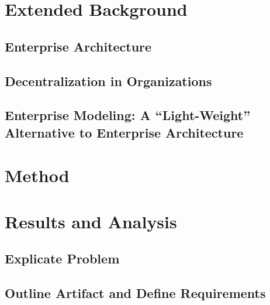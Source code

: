 \documentclass[12pt, a4, twoside, openright]{book}
\begin{document}
    \chapter{Extended Background}
    \label{chap:extendedBackgrounf}
    
    \section{Enterprise Architecture}
    \label{sec:ea}
    
    
    \section{Decentralization in Organizations}
    \label{sec:organizations}
       
    
    \section{Enterprise Modeling: A ``Light-Weight'' Alternative to Enterprise Architecture}
    \label{sec:related}
    
    
    
    \chapter{Method}
    \label{chap:method}
    
    
    
    \chapter{Results and Analysis}
    \label{chap:results}  
    
    
    \section{Explicate Problem}    
    \label{sec:exproblem}
    
    
    \section{Outline Artifact and Define Requirements}
    \label{sec:outline}
        
    
\end{document}
